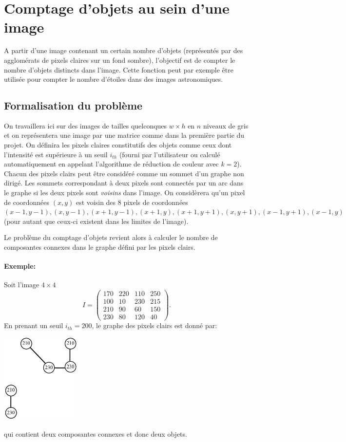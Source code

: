 \documentclass[a4paper,10pt]{article}
\begin{document}
\section{Comptage d'objets au sein d'une image}

A partir d'une image contenant un certain nombre d'objets (représentés par des agglomérats de pixels claires sur un fond sombre), l'objectif est de compter le nombre d'objets
distincts dans l'image. Cette fonction peut par exemple être utilisée
pour compter le nombre d'étoiles dans des images astronomiques.

\subsection*{Formalisation du problème}

On travaillera ici sur des images de tailles quelconques $w\times h$
en $n$ niveaux de gris et on représentera une image par une matrice
comme dans la première partie du projet. On définira les pixels
claires constitutifs des objets comme ceux dont l'intensité est
supérieure à un seuil $i_{th}$ (fourni par l'utilisateur ou calculé
automatiquement en appelant l'algorithme de réduction de couleur avec
$k=2$). Chacun des pixels clairs peut être considéré comme un sommet
d'un graphe non dirigé. Les sommets correspondant à deux pixels sont
connectés par un arc dans le graphe si les deux pixels sont {\it voisins}
dans l'image. On considèrera qu'un pixel de coordonnées $(x,y)$ est
voisin des 8 pixels de coordonnées $(x-1,y-1), (x,y-1), (x+1,y-1),
(x+1,y), (x+1, y+1), (x,y+1), (x-1,y+1), (x-1,y)$ (pour autant que
ceux-ci existent dans les limites de l'image).

Le problème du comptage d'objets revient alors à calculer le nombre de
composantes connexes dans le graphe défini par les pixels clairs.

\paragraph{Exemple:} Soit l'image $4\times 4$
$$I=\left(\begin{matrix}
170&220&110&250\\
100&10&230&215\\
210&90&60&150\\
230&80&120&40
\end{matrix}\right).
$$
En prenant un seuil $i_{th}=200$, le graphe des pixels clairs est donné par:
\begin{center}
\includegraphics[width=4cm]{pict3.pdf}
\end{center}
qui contient deux composantes connexes et donc deux objets.
\end{document}
